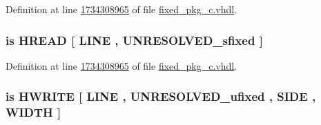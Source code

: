 Definition at line \hyperlink{fixed__pkg__c_8vhdl_source_l1734308965}{1734308965} of file \hyperlink{fixed__pkg__c_8vhdl_source}{fixed\+\_\+pkg\+\_\+c.\+vhdl}.

\hypertarget{classfixed__pkg_a41a3927a79e29dde8cae5d15109b92b9}{}
\subsubsection[{H\+E\+X\+\_\+\+R\+E\+A\+D}]{ {\bfseries \textcolor{keywordflow}{is}\textcolor{vhdlchar}{ }\textcolor{vhdlchar}{H\+R\+E\+A\+D}\textcolor{vhdlchar}{ }\textcolor{vhdlchar}{\mbox{[}}\textcolor{vhdlchar}{ }\textcolor{vhdlchar}{L\+I\+N\+E}\textcolor{vhdlchar}{ }\textcolor{vhdlchar}{,}\textcolor{vhdlchar}{ }{\bfseries {\bf U\+N\+R\+E\+S\+O\+L\+V\+E\+D\+\_\+sfixed}} \textcolor{vhdlchar}{ }\textcolor{vhdlchar}{\mbox{]}}\textcolor{vhdlchar}{ }} \hspace{0.3cm}{\ttfamily [Alias]}}\label{classfixed__pkg_a41a3927a79e29dde8cae5d15109b92b9}


Definition at line \hyperlink{fixed__pkg__c_8vhdl_source_l1734308965}{1734308965} of file \hyperlink{fixed__pkg__c_8vhdl_source}{fixed\+\_\+pkg\+\_\+c.\+vhdl}.

\hypertarget{classfixed__pkg_a30e0c351405ef18dcbe9f3ac44f09b42}{}
\subsubsection[{H\+E\+X\+\_\+\+W\+R\+I\+T\+E}]{ {\bfseries \textcolor{keywordflow}{is}\textcolor{vhdlchar}{ }\textcolor{vhdlchar}{H\+W\+R\+I\+T\+E}\textcolor{vhdlchar}{ }\textcolor{vhdlchar}{\mbox{[}}\textcolor{vhdlchar}{ }\textcolor{vhdlchar}{L\+I\+N\+E}\textcolor{vhdlchar}{ }\textcolor{vhdlchar}{,}\textcolor{vhdlchar}{ }{\bfseries {\bf U\+N\+R\+E\+S\+O\+L\+V\+E\+D\+\_\+ufixed}} \textcolor{vhdlchar}{ }\textcolor{vhdlchar}{,}\textcolor{vhdlchar}{ }\textcolor{vhdlchar}{S\+I\+D\+E}\textcolor{vhdlchar}{ }\textcolor{vhdlchar}{,}\textcolor{vhdlchar}{ }\textcolor{vhdlchar}{W\+I\+D\+T\+H}\textcolor{vhdlchar}{ }\textcolor{vhdlchar}{\mbox{]}}\textcolor{vhdlchar}{ }} \hspace{0.3cm}{\ttfamily [Alias]}}\label{classfixed__pkg_a30e0c351405ef18dcbe9f3ac44f09b42}


